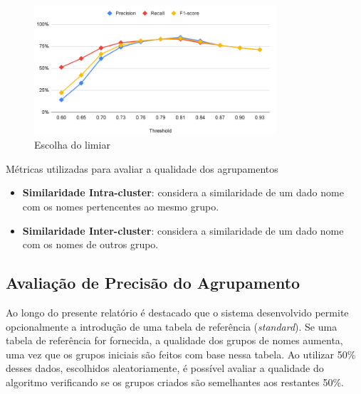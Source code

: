 \documentclass[a4paper,12pt]{article}
\begin{document}
\newpage
\begin{figure}[h!]
    \centering
    \includegraphics[width=0.8\textwidth]{images/threshold.png}
    \caption{Escolha do limiar}
    \label{fig:design}
\end{figure}
\noindent Métricas utilizadas para avaliar a qualidade dos agrupamentos

\begin{itemize}
    \item \textbf{Similaridade Intra-cluster}: considera a similaridade de um dado nome com os nomes pertencentes ao mesmo grupo.
    \item \textbf{Similaridade Inter-cluster}: considera a similaridade de um dado nome com os nomes de outros grupo.
\end{itemize}

\subsection{Avaliação de Precisão do Agrupamento}

Ao longo do presente relatório é destacado que o sistema desenvolvido permite opcionalmente a introdução de uma tabela de referência (\textit{standard}). Se uma tabela de referência for fornecida, a qualidade dos grupos de nomes aumenta, uma vez que os grupos iniciais são feitos com base nessa tabela. Ao utilizar 50\% desses dados, escolhidos aleatoriamente, é possível avaliar a qualidade do algoritmo verificando se os grupos criados são semelhantes aos restantes 50\%.
\end{document}
